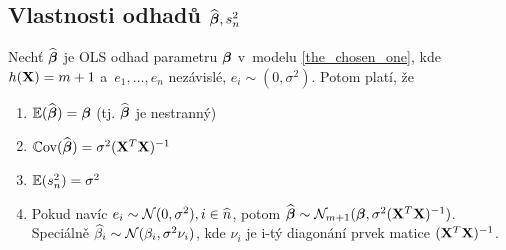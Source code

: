 \subsection{Vlastnosti odhadů $\widehat{\boldsymbol{\beta}}, s_n^2$ }
\begin{theorem}
	Nechť $\widehat{\boldsymbol{\beta}}$ je OLS odhad parametru $\boldsymbol{\beta}$ v~modelu \eqref{the_chosen_one}, kde $h(\mathbf{X}) = m+1$ a~$e_1,\dots, e_n$ nezávislé, $e_i \sim (0,\sigma^2)$. Potom platí, že
	\begin{enumerate}
		\item $\mathbb{E}(\widehat{\boldsymbol{\beta}}) = \boldsymbol{\beta}$ (tj. $\widehat{\boldsymbol{\beta}}$ je nestranný)
		\item $\mathbb{C}\mathrm{ov}(\widehat{\boldsymbol{\beta}}) = \sigma^2 (\mathbf{X}^T \mathbf{X})^{-1}$
		\item $\mathbb{E}(s_n^2) = \sigma^2$
		\item Pokud navíc $e_i \sim \mathcal{N}(0,\sigma^2), i\in\widehat{n} $, potom $\widehat{\boldsymbol{\beta}} \sim \mathcal{N}_{m+1}(\boldsymbol{\beta}, \sigma^2(\mathbf{X}^T \mathbf{X})^{-1})$. Speciálně $\widehat{\beta}_i \sim \mathcal{N}(\beta_i, \sigma^2 \nu_i)$, kde $\nu_i$ je i-tý diagonání prvek matice $(\mathbf{X}^T \mathbf{X})^{-1}$.
	\end{enumerate}
\end{theorem}

